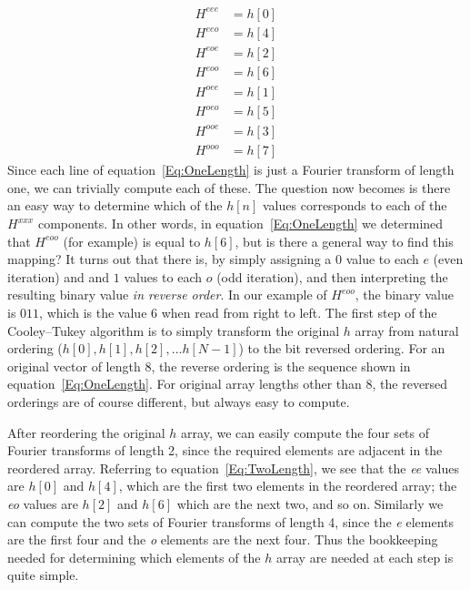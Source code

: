 \documentclass[10pt]{article}
\begin{document}
\begin{equation}
\label{Eq:OneLength}
\begin{aligned}
H^{eee} & = h[0] \\
H^{eeo} & = h[4] \\
H^{eoe} & = h[2] \\
H^{eoo} & = h[6] \\
H^{oee} & = h[1] \\
H^{oeo} & = h[5] \\
H^{ooe} & = h[3] \\
H^{ooo} & = h[7]
\end{aligned}
\end{equation}
Since each line of equation~\ref{Eq:OneLength} is just a Fourier
transform of length one, we can trivially compute each of these.
The question now becomes is there an easy way to determine which of
the $h[n]$ values corresponds to each of the $H^{xxx}$ components.
In other words, in equation~\ref{Eq:OneLength} we determined that
$H^{eoo}$ (for example) is equal to  $h[6]$, but is there a general
way to find this mapping?  It turns out that there is, by simply
assigning a $0$ value to each $e$ (even iteration) and and $1$
values to each $o$ (odd iteration), and then interpreting the
resulting binary value {\em in reverse order}.  In our example
of $H^{eoo}$, the binary value is $011$, which is the value $6$
when read from right to left.  The first step of the Cooley--Tukey
algorithm is to simply transform the original $h$ array from natural
ordering ($h[0], h[1], h[2], \ldots h[N-1]$) to the bit reversed ordering.
For an original vector of length $8$, the reverse ordering is the 
sequence shown in equation~\ref{Eq:OneLength}.  For original array
lengths other than $8$, the reversed orderings are of course different,
but always easy to compute.

After reordering the original $h$ array, we can easily compute the four
sets of Fourier transforms of length 2, since the required elements
are adjacent in the reordered array.  Referring to equation~\ref{Eq:TwoLength},
we see that the {\em ee} values are $h[0]$ and $h[4]$, which are
the first two elements in the reordered array; the {\em eo} values
are $h[2]$ and $h[6]$ which are the next two, and so on.  Similarly
we can compute the two sets of Fourier transforms of length 4, since
the {\em e} elements are the first four and the {\em o} elements 
are the next four.  Thus the bookkeeping needed for determining which
elements of the $h$ array are needed at each step is quite simple.
\end{document}
